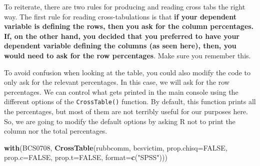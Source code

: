 \documentclass[
]{book}
\newenvironment{Shaded}{\begin{snugshade}}{\end{snugshade}}
\newcommand{\AttributeTok}[1]{\textcolor[rgb]{0.13,0.29,0.53}{#1}}
\newcommand{\ConstantTok}[1]{\textcolor[rgb]{0.56,0.35,0.01}{#1}}
\newcommand{\FunctionTok}[1]{\textcolor[rgb]{0.13,0.29,0.53}{\textbf{#1}}}
\newcommand{\NormalTok}[1]{#1}
\newcommand{\StringTok}[1]{\textcolor[rgb]{0.31,0.60,0.02}{#1}}
\begin{document}
To reiterate, there are two rules for producing and reading cross tabs the right way. The first rule for reading cross-tabulations is that \textbf{if your dependent variable is defining the rows, then you ask for the column percentages. If, on the other hand, you decided that you preferred to have your dependent variable defining the columns (as seen here), then, you would need to ask for the row percentages}. Make sure you remember this.

To avoid confusion when looking at the table, you could also modify the code to only ask for the relevant percentages. In this case, we will ask for the row percentages. We can control what gets printed in the main console using the different options of the \texttt{CrossTable()} function. By default, this function prints all the percentages, but most of them are not terribly useful for our purposes here. So, we are going to modify the default options by asking R not to print the column nor the total percentages.

\begin{Shaded}
\begin{Highlighting}[]
\FunctionTok{with}\NormalTok{(BCS0708, }\FunctionTok{CrossTable}\NormalTok{(rubbcomm, bcsvictim, }\AttributeTok{prop.chisq=}\ConstantTok{FALSE}\NormalTok{, }\AttributeTok{prop.c=}\ConstantTok{FALSE}\NormalTok{, }\AttributeTok{prop.t=}\ConstantTok{FALSE}\NormalTok{, }\AttributeTok{format=}\FunctionTok{c}\NormalTok{(}\StringTok{"SPSS"}\NormalTok{)))}
\end{Highlighting}
\end{Shaded}
\end{document}

